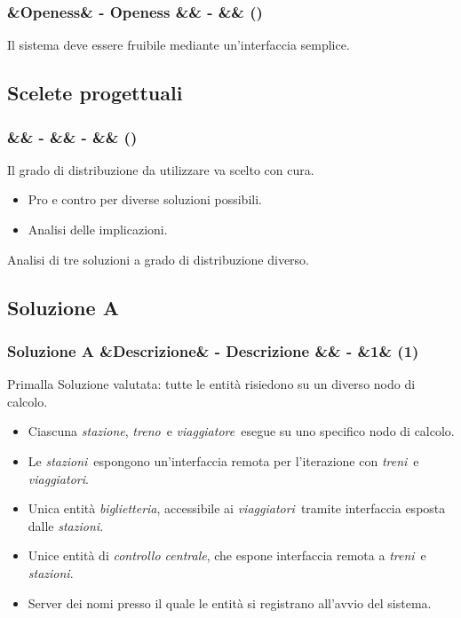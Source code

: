 \documentclass[slidestop,compress,blackandwhite]{beamer}
\newcommand{\ii}[1]{\textit{#1}}
\newcommand{\treno}{\ii{treno}}
\newcommand{\treni}{\ii{treni}}
\newcommand{\viaggiatore}{\ii{viaggiatore}}
\newcommand{\viaggiatori}{\ii{viaggiatori}}
\newcommand{\stazione}{\ii{stazione}}
\newcommand{\stazioni}{\ii{stazioni}}
\newcommand{\biglietteria}{\ii{biglietteria}}
\newcommand{\controller}{\ii{controllo centrale}}
\newcommand{\newtitle}[4]{
	#1 
	\ifx&#2&%
	\else
  		\large- #2
	\fi
	\ifx&#3&%
	\else
  		\normalsize- #3
	\fi
	\ifx&#4&%
	\else
  		\normalsize (#4)
	\fi
}
\newcommand{\newframe}[5]{
	\begin{frame}
		\frametitle{\newtitle{#1}{#2}{#3}{#4}}
		#5
	\end{frame}
}
\begin{document}
	
	\newframe{}{Openess}{}{}{
		Il sistema deve essere fruibile mediante un'interfaccia semplice.
		
	}

	
	\subsection{Scelete progettuali}\label{scelte}
	
	\newframe{}{}{}{}{
		
		Il grado di distribuzione da utilizzare va scelto con cura.
		\begin{itemize}
			\item Pro e contro per diverse soluzioni possibili.
			\item Analisi delle implicazioni.
		\end{itemize}
		
		Analisi di tre soluzioni a grado di distribuzione diverso. 
		
	}
	
	\subsection{Soluzione A}
	
	\newframe{Soluzione A}{Descrizione}{}{1}{
		Primalla Soluzione valutata: tutte le entità risiedono su un diverso nodo di calcolo.
		\begin{itemize}
			\item Ciascuna \stazione, \treno~e \viaggiatore~esegue su uno specifico nodo di calcolo.  
			\item Le \stazioni~espongono un'interfaccia remota per l'iterazione con \treni~e \viaggiatori.
			\item Unica entità \biglietteria, accessibile ai \viaggiatori~tramite interfaccia esposta dalle \stazioni.
			\item Unice entità di \controller, che espone interfaccia remota a \treni~e \stazioni.
			\item Server dei nomi presso il quale le entità si registrano all'avvio del sistema.
		\end{itemize}
	}
	
\end{document}
